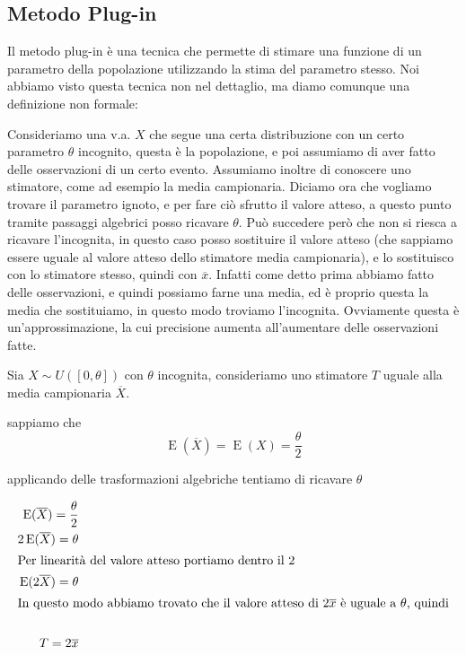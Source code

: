 \subsection{Metodo Plug-in}
Il metodo plug-in è una tecnica che permette di stimare una funzione di un parametro della popolazione utilizzando la stima del parametro stesso.
Noi abbiamo visto questa tecnica non nel dettaglio, ma diamo comunque una definizione non formale:

\noindent Consideriamo una v.a. $X$ che segue una certa distribuzione con un certo parametro $\theta$ incognito, questa è la popolazione, e poi assumiamo di aver fatto delle osservazioni di un certo evento.
Assumiamo inoltre di conoscere uno stimatore, come ad esempio la media campionaria.
Diciamo ora che vogliamo trovare il parametro ignoto, e per fare ciò sfrutto il valore atteso, a questo punto tramite passaggi algebrici posso ricavare $\theta$.
Può succedere però che non si riesca a ricavare l'incognita, in questo caso posso sostituire il valore atteso (che sappiamo essere uguale al valore atteso dello stimatore media campionaria), e lo sostituisco con lo stimatore stesso, quindi con $\overline{x}$.
Infatti come detto prima abbiamo fatto delle osservazioni, e quindi possiamo farne una media, ed è proprio questa la media che sostituiamo, in questo modo troviamo l'incognita.
Ovviamente questa è un'approssimazione, la cui precisione aumenta all'aumentare delle osservazioni fatte.

\begin{esempio}

Sia $X \sim U([0, \theta])$ con $\theta$ incognita, consideriamo uno stimatore $T$ uguale alla media campionaria $\overline{X}$.

\noindent sappiamo che
$$\operatorname{E}(\overline{X}) = \operatorname{E}(X) = \frac{\theta}{2}$$

\noindent applicando delle trasformazioni algebriche tentiamo di ricavare $\theta$

\begin{align*}
    \operatorname{E}(\overline{X}) = \frac{\theta}{2} \\
    2 \operatorname{E}(\overline{X}) = \theta \\
    \intertext{Per linearità del valore atteso portiamo dentro il $2$}
    \operatorname{E}(2\overline{X}) = \theta \\
    \intertext{In questo modo abbiamo trovato che il valore atteso di $2\overline{x}$ è uguale a $\theta$, quindi}\\
    T = 2\overline{x}
\end{align*}
\end{esempio}

